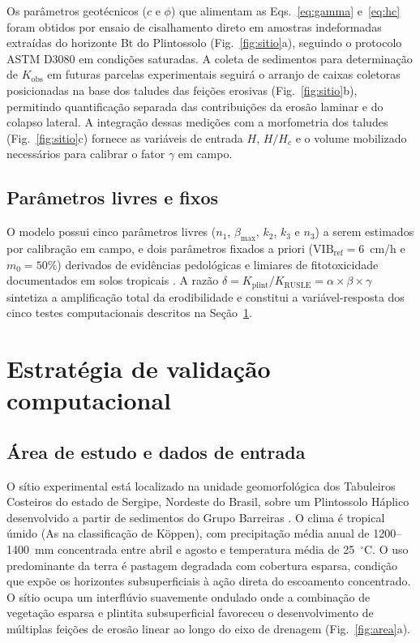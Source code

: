 \documentclass[pdflatex,sn-basic]{sn-jnl}
\begin{document}
Os parâmetros geotécnicos ($c$ e $\phi$) que alimentam as Eqs.~\ref{eq:gamma} e~\ref{eq:hc} foram obtidos por ensaio de cisalhamento direto em amostras indeformadas extraídas do horizonte Bt do Plintossolo (Fig.~\ref{fig:sitio}a), seguindo o protocolo ASTM D3080 em condições saturadas. A coleta de sedimentos para determinação de $K_{\mathrm{obs}}$ em futuras parcelas experimentais seguirá o arranjo de caixas coletoras posicionadas na base dos taludes das feições erosivas (Fig.~\ref{fig:sitio}b), permitindo quantificação separada das contribuições da erosão laminar e do colapso lateral. A integração dessas medições com a morfometria dos taludes (Fig.~\ref{fig:sitio}c) fornece as variáveis de entrada $H$, $H/H_c$ e o volume mobilizado necessários para calibrar o fator $\gamma$ em campo.

\subsection{Parâmetros livres e fixos}

O modelo possui cinco parâmetros livres ($n_1$, $\beta_{\max}$, $k_2$, $k_3$ e $n_3$) a serem estimados por calibração em campo, e dois parâmetros fixados a priori ($\mathrm{VIB_{ref}} = 6$~cm/h e $m_0 = 50\%$) derivados de evidências pedológicas e limiares de fitotoxicidade documentados em solos tropicais \citep{embrapa_2018}. A razão $\delta = K_{\mathrm{plint}} / K_{\mathrm{RUSLE}} = \alpha \times \beta \times \gamma$ sintetiza a amplificação total da erodibilidade e constitui a variável-resposta dos cinco testes computacionais descritos na Seção~\ref{sec:validation}.

\section{Estratégia de validação computacional}
\label{sec:validation}

\subsection{Área de estudo e dados de entrada}

O sítio experimental está localizado na unidade geomorfológica dos Tabuleiros Costeiros do estado de Sergipe, Nordeste do Brasil, sobre um Plintossolo Háplico desenvolvido a partir de sedimentos do Grupo Barreiras \citep{nascimento_pedrotti_2004}. O clima é tropical úmido (As na classificação de Köppen), com precipitação média anual de 1200--1400~mm concentrada entre abril e agosto e temperatura média de 25~$^\circ$C. O uso predominante da terra é pastagem degradada com cobertura esparsa, condição que expõe os horizontes subsuperficiais à ação direta do escoamento concentrado. O sítio ocupa um interflúvio suavemente ondulado onde a combinação de vegetação esparsa e plintita subsuperficial favoreceu o desenvolvimento de múltiplas feições de erosão linear ao longo do eixo de drenagem (Fig.~\ref{fig:area}a).
\end{document}
